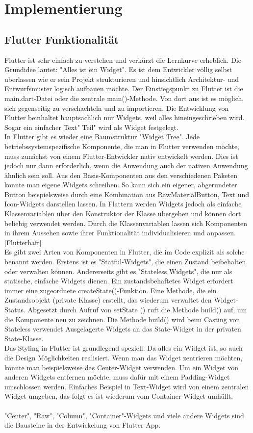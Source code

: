 \section{Implementierung}
\subsection{Flutter Funktionalität}
Flutter ist sehr einfach zu verstehen und verkürzt die Lernkurve erheblich. Die Grundidee lautet: "Alles ist ein Widget". Es ist dem Entwickler völlig selbst uberlassen wie er sein Projekt
strukturieren und hinsichtlich Architektur- und Entwurfsmuster logisch aufbauen möchte. Der Einstiegspunkt zu Flutter ist die main.dart-Datei oder die zentrale main()-Methode. Von dort aus ist es möglich, sich gegenseitig zu verschachteln und zu importieren. 
Die Entwicklung von Flutter beinhaltet hauptsächlich nur Widgets, weil alles hineingeschrieben wird.
Sogar ein einfacher Text" Teil" wird als Widget festgelegt. 
\\
In Flutter gibt es wieder eine Baumstruktur "Widget Tree". Jede betriebssystemspezifische Komponente, die man in Flutter verwenden möchte, muss zunächst von einem Flutter-Entwickler nativ entwickelt werden. Dies ist jedoch nur dann erforderlich, wenn die Anwendung auch der nativen Anwendung ähnlich sein soll. 
Aus den Basis-Komponenten aus den verschiedenen Paketen konnte man eigene Widgets schreiben. So kann sich ein eigener, abgerundeter Button beispielsweise durch eine Kombination aus RawMaterialButton, Text und Icon-Widgets darstellen lassen.
In Flattern werden Widgets jedoch als einfache Klassenvariablen über den Konstruktor der Klasse übergeben und können dort beliebig verwendet werden.
Durch die Klassenvariablen lassen sich Komponenten in
ihrem Aussehen sowie ihrer Funktionalität individualisieren und anpassen.[Flutterhaft]\\
Es gibt zwei Arten von Komponenten in Flutter, die im Code explizit als solche benannt werden. Erstens ist es "Statful-Widgets", die einen Zustand beibehalten oder verwalten können. Andererseits gibt es "Stateless Widgets", die nur als statische, einfache Widgets dienen. Ein zustandsbehaftetes Widget erfordert immer eine zugeordnete createState()-Funktion. Eine Methode, die ein Zustandsobjekt (private Klasse) erstellt, das wiederum
verwaltet den Widget-Status. Abgesetzt durch Aufruf von setState ()
ruft die Methode build() auf, um die Komponente neu zu zeichnen. Die Methode build() wird beim Casting von Stateless verwendet
Ausgelagerte Widgets an das State-Widget in der privaten State-Klasse.\\
Das Styling in Flutter ist grundlegend speziell. Da alles ein Widget ist, so auch die Design Möglichkeiten realisiert.
Wenn man das Widget zentrieren möchten, könnte man beispielsweise das Center-Widget verwenden.
Um ein Widget von anderen Widgets entfernen möchte, muss dafür mit einem Padding-Widget umschlossen werden. Einfaches Beispiel in Text-Widget wird von einem zentralen Widget umgeben, das folgt
es ist wiederum vom Container-Widget umhüllt.\\\\
"Center", "Raw", "Column", "Container"-Widgets und viele andere Widgets
sind die Bausteine in der Entwickelung von Flutter App.

